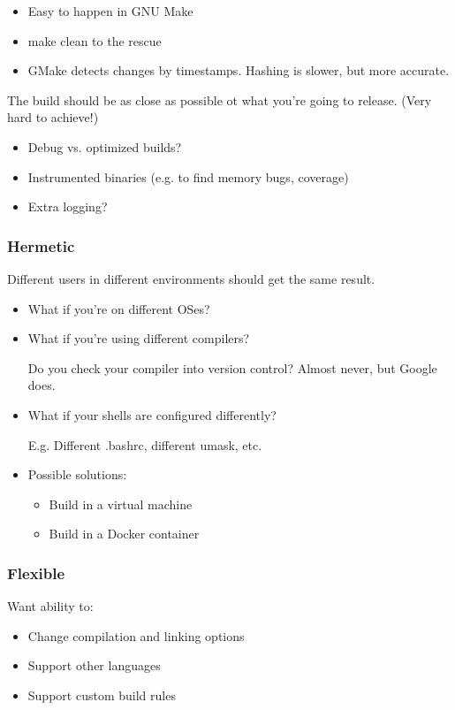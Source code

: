 \documentclass{article}
\begin{document}
\begin{itemize}
    \item Easy to happen in GNU Make
    \item make clean to the rescue
    \item GMake detects changes by timestamps. Hashing is slower, but more accurate.
\end{itemize}

The build should be as close as possible ot what you're going to release. (Very hard to achieve!)
\begin{itemize}
    \item Debug vs. optimized builds?
    \item Instrumented binaries (e.g. to find memory bugs, coverage)
    \item Extra logging?
\end{itemize}

\subsubsection{Hermetic}
Different users in different environments should get the same result.

\begin{itemize}
    \item What if you're on different OSes? 
    \item What if you're using different compilers?

    Do you check your compiler into version control? Almost never, but Google does.
    \item What if your shells are configured differently?
    
    E.g. Different .bashrc, different umask, etc. 
    \item Possible solutions:
    \begin{itemize}
        \item Build in a virtual machine
        \item Build in a Docker container
    \end{itemize}
\end{itemize}

\subsubsection{Flexible}

Want ability to:
\begin{itemize}
    \item Change compilation and linking options
    \item Support other languages 
    \item Support custom build rules 
\end{itemize}
\end{document}
